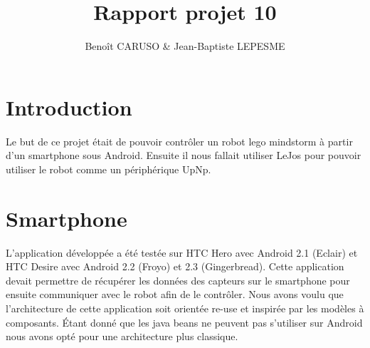 \documentclass[10pt,a4paper]{article}
\author{Benoît CARUSO & Jean-Baptiste LEPESME}
\title{Rapport projet 10}
\begin{document}
\maketitle

\section{Introduction}
	Le but de ce projet était de pouvoir contr\^oler un robot lego mindstorm à partir d'un smartphone sous Android.
	Ensuite il nous fallait utiliser LeJos pour pouvoir utiliser le robot comme un périphérique UpNp.
\section{Smartphone}
	L'application développée a été testée sur HTC Hero avec Android 2.1 (Eclair) et HTC Desire avec Android 2.2 (Froyo) et 2.3 (Gingerbread).
	Cette application devait permettre de récupérer les données des capteurs sur le smartphone pour ensuite communiquer avec le robot afin de le contr\^oler.
	Nous avons voulu que l'architecture de cette application soit orientée re-use et inspirée par les modèles à composants.
	Étant donné que les java beans ne peuvent pas s'utiliser sur Android nous avons opté pour une architecture plus classique.
\end{document}
